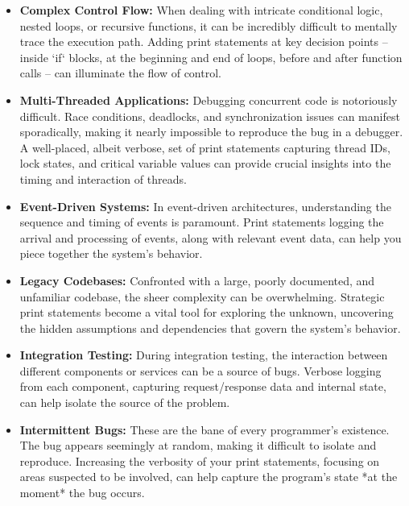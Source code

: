 \documentclass{article}
\begin{document}
\begin{itemize}
    \item \textbf{Complex Control Flow:} When dealing with intricate conditional logic, nested loops, or recursive functions, it can be incredibly difficult to mentally trace the execution path. Adding print statements at key decision points – inside `if` blocks, at the beginning and end of loops, before and after function calls – can illuminate the flow of control.

    \item \textbf{Multi-Threaded Applications:} Debugging concurrent code is notoriously difficult. Race conditions, deadlocks, and synchronization issues can manifest sporadically, making it nearly impossible to reproduce the bug in a debugger. A well-placed, albeit verbose, set of print statements capturing thread IDs, lock states, and critical variable values can provide crucial insights into the timing and interaction of threads.

    \item \textbf{Event-Driven Systems:} In event-driven architectures, understanding the sequence and timing of events is paramount. Print statements logging the arrival and processing of events, along with relevant event data, can help you piece together the system's behavior.

    \item \textbf{Legacy Codebases:} Confronted with a large, poorly documented, and unfamiliar codebase, the sheer complexity can be overwhelming.  Strategic print statements become a vital tool for exploring the unknown, uncovering the hidden assumptions and dependencies that govern the system's behavior.

    \item \textbf{Integration Testing:} During integration testing, the interaction between different components or services can be a source of bugs.  Verbose logging from each component, capturing request/response data and internal state, can help isolate the source of the problem.

    \item \textbf{Intermittent Bugs:} These are the bane of every programmer's existence. The bug appears seemingly at random, making it difficult to isolate and reproduce. Increasing the verbosity of your print statements, focusing on areas suspected to be involved, can help capture the program's state *at the moment* the bug occurs.
\end{itemize}
\end{document}
